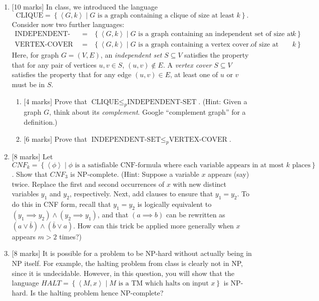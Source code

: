 \documentclass{article}
\newcommand{\class}[1]{\text{#1}}
\newcommand{\set}[1]{{\left\{#1\right\}}}    %
\newcommand{\enc}[1]{\left<#1\right>}
\begin{document}
\begin{enumerate}
    \item {[10 marks]} In class, we introduced the language
    \[
        \class{CLIQUE} = \set{\enc{G,k}\mid G\text{ is a graph containing a clique of size at least }k}.
    \]
    Consider now two further languages:
    \begin{eqnarray*}
        \class{INDEPENDENT-SET} &=& \set{\enc{G,k}\mid G\text{ is a graph containing an independent set of size at least }k}\\
        \class{VERTEX-COVER} &=& \set{\enc{G,k}\mid G\text{ is a graph containing a vertex cover of size at most }k}.
    \end{eqnarray*}
    Here, for graph $G=(V,E)$, an \emph{independent set} $S\subseteq V$ satisfies the property that for any pair of vertices $u,v\in S$, $(u,v)\not\in E$. A \emph{vertex cover} $S\subseteq V$ satisfies the property that for any edge $(u,v)\in E$, at least one of $u$ or $v$ must be in $S$.
    \begin{enumerate}
        \item {[4 marks]} Prove that $\class{CLIQUE}\leq_p\class{INDEPENDENT-SET}$. (Hint: Given a graph $G$, think about its \emph{complement}. Google ``complement graph'' for a definition.)
        \item {[6 marks]} Prove that $\class{INDEPENDENT-SET}\leq_p\class{VERTEX-COVER}$.


    \end{enumerate}
    \item {[8 marks]} Let $CNF_k=\set{\enc{\phi}\mid\phi\text{ is a satisfiable CNF-formula where each variable appears in at most }k\text{ places}}$. Show that ${CNF}_3$ is NP-complete. (Hint: Suppose a variable $x$ appears (say) twice. Replace the first and second occurrences of $x$ with new distinct variables $y_1$ and $y_2$, respectively. Next, add clauses to ensure that $y_1=y_2$. To do this in CNF form, recall that $y_1=y_2$ is logically equivalent to $(y_1\implies y_2)\wedge(y_2\implies y_1)$, and that $(a\implies b)$ can be rewritten as $(a\vee \bar{b})\wedge (\bar{b}\vee {a})$. How can this trick be applied more generally when $x$ appears $m>2$ times?)



    \item {[8 marks]} It is possible for a problem to be NP-hard without actually being in NP itself. For example, the halting problem from class is clearly not in NP, since it is undecidable. However, in this question, you will show that the language $HALT=\set{\enc{M,x}\mid M\text{ is a TM which halts on input }x}$ is NP-hard. Is the halting problem hence NP-complete?



\end{enumerate}
\end{document}
